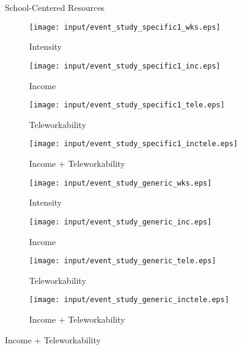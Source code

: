 \begin{figure}
  \caption{School-Centered Resources}
    \centering
    \begin{subfigure}[t]{0.45\textwidth}
    \caption{Intensity}
        \centering
        \texttt{[image: input/event\_study\_specific1\_wks.eps]}
    \end{subfigure}%
    \begin{subfigure}[t]{0.45\textwidth}
    \caption{Income}
        \centering
        \texttt{[image: input/event\_study\_specific1\_inc.eps]}
    \end{subfigure}%

    \begin{subfigure}{0.45\textwidth}
    \caption{Teleworkability}
        \centering
        \texttt{[image: input/event\_study\_specific1\_tele.eps]}
    \end{subfigure}%
    \begin{subfigure}{0.45\textwidth}
    \caption{Income + Teleworkability}
        \centering
        \texttt{[image: input/event\_study\_specific1\_inctele.eps]}
    \end{subfigure}%

  \caption{Parent-Centered}
    \centering
    \begin{subfigure}[t]{0.45\textwidth}
    \caption{Intensity}
        \centering
        \texttt{[image: input/event\_study\_generic\_wks.eps]}
    \end{subfigure}%
    \begin{subfigure}[t]{0.45\textwidth}
    \caption{Income}
        \centering
        \texttt{[image: input/event\_study\_generic\_inc.eps]}
    \end{subfigure}%

    \begin{subfigure}[t]{0.45\textwidth}
    \caption{Teleworkability}
        \centering
        \texttt{[image: input/event\_study\_generic\_tele.eps]}
    \end{subfigure}%
    \begin{subfigure}[t]{0.45\textwidth}
    \caption{Income + Teleworkability}
        \centering
        \texttt{[image: input/event\_study\_generic\_inctele.eps]}
    \end{subfigure}%
\end{figure}


